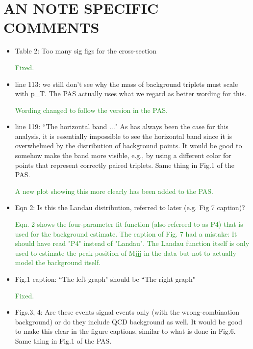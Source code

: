 \documentclass[paper=a4, fontsize=11pt]{scrartcl}
\begin{document}
\section{AN NOTE SPECIFIC COMMENTS}
\begin{itemize}
\item Table 2: Too many sig figs for the cross-section

\textcolor{ForestGreen}{Fixed.}\\

\item line 113: we still don't see why the mass of background triplets must scale with p\_T. The PAS actually uses what we regard as better wording for this.

\textcolor{ForestGreen}{Wording changed to follow the version in the PAS.}\\

\item line 119: ``The horizontal band ..." As has always been the case for this analysis, it is essentially impossible to see the horizontal band since it is overwhelmed by the distribution of background points. It would be good to somehow make the band more visible, e.g., by using a different color for points that represent correctly paired triplets. Same thing in Fig.1 of the PAS.

\textcolor{ForestGreen}{A new plot showing this more clearly has been added to the PAS.}\\

\item Eqn 2: Is this the Landau distribution, referred to later (e.g. Fig 7 caption)?

\textcolor{ForestGreen}{Eqn. 2 shows the four-parameter fit function (also refereed to as P4) that is used for the background estimate. The caption of Fig. 7 had a mistake: It should have read "P4" instead of "Landau". The Landau function itself is only used to estimate the peak position of Mjjj in the data but not to actually model the background itself.}\\

\item Fig.1 caption: ``The left graph" should be ``The right graph"

\textcolor{ForestGreen}{Fixed.}\\

\item Figs.3, 4: Are these events signal events only (with the wrong-combination background) or do they include QCD background as well. It would be good to make this clear in the figure captions, similar to what is done in Fig.6. Same thing in Fig.1 of the PAS.


\end{itemize}
\end{document}
